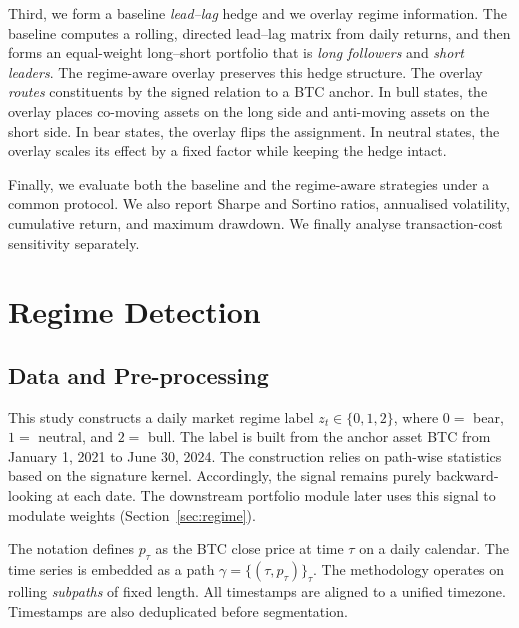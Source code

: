 Third, we form a baseline \emph{lead--lag} hedge and we overlay regime information. The baseline computes a rolling, directed lead--lag matrix from daily returns, and then forms an equal-weight long--short portfolio that is \emph{long followers} and \emph{short leaders}. The regime-aware overlay preserves this hedge structure. The overlay \emph{routes} constituents by the signed relation to a BTC anchor. In bull states, the overlay places co-moving assets on the long side and anti-moving assets on the short side. In bear states, the overlay flips the assignment. In neutral states, the overlay scales its effect by a fixed factor while keeping the hedge intact.

Finally, we evaluate both the baseline and the regime-aware strategies under a common protocol. We also report Sharpe and Sortino ratios, annualised volatility, cumulative return, and maximum drawdown. We finally analyse transaction-cost sensitivity separately. 




\section{Regime Detection}\label{sec:regime-detection}

\subsection{Data and Pre-processing}
This study constructs a daily market regime label $z_t\in\{0,1,2\}$, where $0=$ bear, $1=$ neutral, and $2=$ bull. The label is built from the anchor asset BTC from January 1, 2021 to June 30, 2024. The construction relies on path-wise statistics based on the signature kernel. Accordingly, the signal remains purely backward-looking at each date. The downstream portfolio module later uses this signal to modulate weights (Section~\ref{sec:regime}).

The notation defines $p_\tau$ as the BTC close price at time $\tau$ on a daily calendar. The time series is embedded as a path $\gamma=\{(\tau,p_\tau)\}_\tau$. The methodology operates on rolling \emph{subpaths} of fixed length. All timestamps are aligned to a unified timezone. Timestamps are also deduplicated before segmentation.


